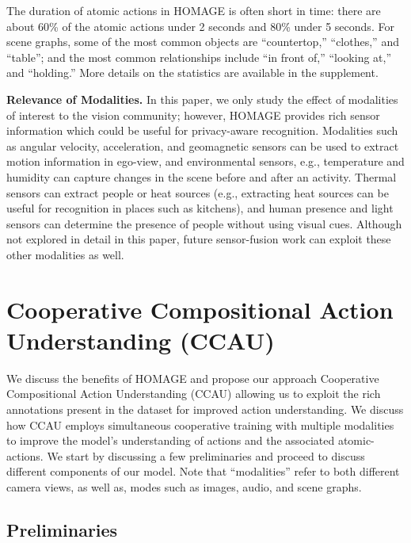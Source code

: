 \documentclass[final]{cvpr}
\begin{document}
The duration of atomic actions in HOMAGE is often short in time: there are about 60\% of the atomic actions under 2 seconds and 80\% under 5 seconds. For scene graphs, some of the most common objects are ``countertop,'' ``clothes,'' and ``table''; and the most common relationships include ``in front of,'' ``looking at,'' and ``holding.'' More details on the statistics are available in the supplement. 

\noindent\textbf{Relevance of Modalities.} In this paper, we only study the effect of modalities of interest to the vision community; however, HOMAGE provides rich sensor information which could be useful for privacy-aware recognition. Modalities such as angular velocity, acceleration, and geomagnetic sensors can be used to extract motion information in ego-view, and environmental sensors, e.g., temperature and humidity can capture changes in the scene before and after an activity. Thermal sensors can extract people or heat sources (e.g., extracting heat sources can be useful for recognition in places such as kitchens), and human presence and light sensors can determine the presence of people without using visual cues. Although not explored in detail in this paper, future sensor-fusion work can exploit these other modalities as well.

\section{Cooperative Compositional Action Understanding (CCAU)}

We discuss the benefits of HOMAGE and propose our approach Cooperative Compositional Action Understanding (CCAU) allowing us to exploit the rich annotations present in the dataset for improved action understanding. We discuss how CCAU employs simultaneous cooperative training with multiple modalities to improve the model's understanding of actions and the associated atomic-actions. We start by discussing a few preliminaries and proceed to discuss different components of our model. Note that ``modalities'' refer to both different camera views, as well as, modes such as images, audio, and scene graphs.

\subsection{Preliminaries}

\label{preliminaries}
\end{document}

